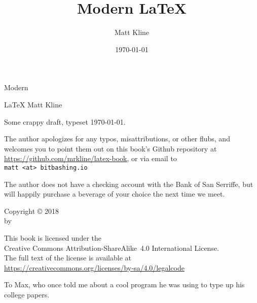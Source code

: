 \documentclass[fontsize=10pt, numbers=endperiod, openany]{scrbook}
\title{Modern LaTeX}
\author{Matt Kline}
\date{\today}
\makeatletter
\let\runauthor\@author
\makeatother
\begin{document}
\fontsize{10pt}{13pt}\selectfont

\frontmatter
\setcounter{secnumdepth}{0}
\setlength\parindent{0pt}

{}
\vspace*{1.5in}
\begin{center}
\fontsize{0.5in}{0.7in}\selectfont
Modern

\fontsize{1in}{1.1in}\selectfont
\LaTeX
\vfill
\LARGE
Matt Kline
\end{center}
\clearpage

\null
\vfill
Some crappy draft, typeset \today.
\vspace*{0.5in}

The author apologizes for any typos, misattributions, or other flubs,
and welcomes you to point them out on this book's Github
repository at \\
\url{https://github.com/mrkline/latex-book}, or via email to \\
\texttt{matt <at> bitbashing.io}

The author does not have a checking account with the Bank of San Serriffe,
but will happily purchase a beverage of your choice the next time we meet.

\vspace*{0.5in}
{
Copyright © 2018 \\
by \runauthor
\bigskip

This book is licensed under the \\
Creative Commons Attribution-ShareAlike~4.0 International License. \\
The full text of the license is available at \\
\url{https://creativecommons.org/licenses/by-sa/4.0/legalcode}
}
\clearpage

\vspace*{1in}
{\itshape%

To Max, who once told me about a cool program he was using to type up
his college papers.
}
\cleardoublepage

\tableofcontents

\mainmatter
\setlength\parindent{1.5em}
\end{document}
